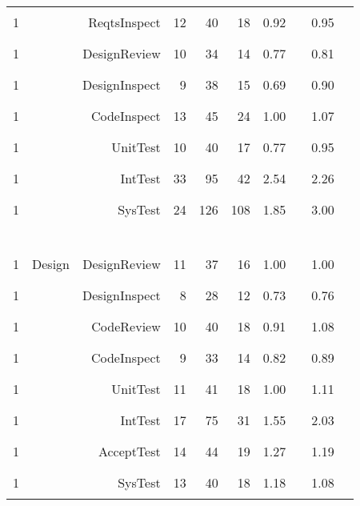 {\begin{tabular}{c@{~}|l@{~}r@{~}|rrr|r@{~}l|r@{~}l}
1 &          &   ReqtsInspect    & 12 & 40 & 18 & 0.92 & \textcolor{black}{\rule{9mm}{2mm}} & 0.95 & \textcolor{Gray}{\rule{9mm}{2mm}}\\
1 &          &   DesignReview    & 10 & 34 & 14 & 0.77 & \textcolor{black}{\rule{7mm}{2mm}} & 0.81 & \textcolor{Gray}{\rule{8mm}{2mm}}\\
1 &          &   DesignInspect   & 9 & 38 & 15 & 0.69 & \textcolor{black}{\rule{6mm}{2mm}} & 0.90 & \textcolor{Gray}{\rule{9mm}{2mm}}\\
1 &          &   CodeInspect     & 13 & 45 & 24 & 1.00 & \textcolor{black}{\rule{10mm}{2mm}} & 1.07 & \textcolor{Gray}{\rule{10mm}{2mm}}\\
1 &          &   UnitTest        & 10 & 40 & 17 & 0.77 & \textcolor{black}{\rule{7mm}{2mm}} & 0.95 & \textcolor{Gray}{\rule{9mm}{2mm}}\\
1 &          &   IntTest         & 33 & 95 & 42 & 2.54 & \textcolor{black}{\rule{25mm}{2mm}} & 2.26 & \textcolor{Gray}{\rule{22mm}{2mm}}\\
1 &          &   SysTest         & 24 & 126 & 108 & 1.85 & \textcolor{black}{\rule{18mm}{2mm}} & 3.00 & \textcolor{Gray}{\rule{30mm}{2mm}}\\
\hline\multicolumn{10}{c}{~}  \\
1 & Design   &   DesignReview    & 11 & 37 & 16 & 1.00 & \textcolor{black}{\rule{10mm}{2mm}} & 1.00 & \textcolor{Gray}{\rule{10mm}{2mm}}\\
1 &   &   DesignInspect   & 8 & 28 & 12 & 0.73 & \textcolor{black}{\rule{7mm}{2mm}} & 0.76 & \textcolor{Gray}{\rule{7mm}{2mm}}\\
1 &   &   CodeReview      & 10 & 40 & 18 & 0.91 & \textcolor{black}{\rule{9mm}{2mm}} & 1.08 & \textcolor{Gray}{\rule{10mm}{2mm}}\\
1 &   &   CodeInspect     & 9 & 33 & 14 & 0.82 & \textcolor{black}{\rule{8mm}{2mm}} & 0.89 & \textcolor{Gray}{\rule{8mm}{2mm}}\\
1 &   &   UnitTest        & 11 & 41 & 18 & 1.00 & \textcolor{black}{\rule{10mm}{2mm}} & 1.11 & \textcolor{Gray}{\rule{12mm}{2mm}}\\
1 &   &   IntTest         & 17 & 75 & 31 & 1.55 & \textcolor{black}{\rule{15mm}{2mm}} & 2.03 & \textcolor{Gray}{\rule{20mm}{2mm}}\\
1 &   &   AcceptTest      & 14 & 44 & 19 & 1.27 & \textcolor{black}{\rule{12mm}{2mm}} & 1.19 & \textcolor{Gray}{\rule{12mm}{2mm}}\\
1 &   &   SysTest         & 13 & 40 & 18 & 1.18 & \textcolor{black}{\rule{12mm}{2mm}} & 1.08 & \textcolor{Gray}{\rule{10mm}{2mm}}\\

\end{tabular}}
